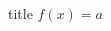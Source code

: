 \documentclass[a4paper]{article}
\begin{document}
\begin{multicols*}{2}

    \begin{cheatsheetblock}{title}
        $f(x) = a$
    \end{cheatsheetblock}

\end{multicols*}
\end{document}
